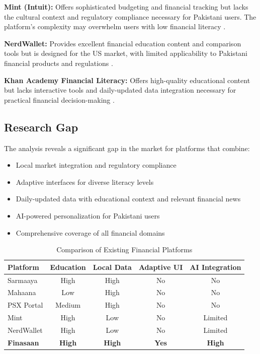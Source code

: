 \documentclass[12pt]{article}
\begin{document}
\textbf{Mint (Intuit):} Offers sophisticated budgeting and financial tracking but lacks the cultural context and regulatory compliance necessary for Pakistani users. The platform's complexity may overwhelm users with low financial literacy \cite{mint2023}.

\textbf{NerdWallet:} Provides excellent financial education content and comparison tools but is designed for the US market, with limited applicability to Pakistani financial products and regulations \cite{nerdwallet2023}.

\textbf{Khan Academy Financial Literacy:} Offers high-quality educational content but lacks interactive tools and daily-updated data integration necessary for practical financial decision-making \cite{khan2023}.

\subsection{Research Gap}

The analysis reveals a significant gap in the market for platforms that combine:
\begin{itemize}
    \item Local market integration and regulatory compliance
    \item Adaptive interfaces for diverse literacy levels
    \item Daily-updated data with educational context and relevant financial news
    \item AI-powered personalization for Pakistani users
    \item Comprehensive coverage of all financial domains
\end{itemize}

\begin{table}[htbp]
\caption{Comparison of Existing Financial Platforms}
\begin{center}
\begin{tabular}{|l|c|c|c|c|}
\hline
\textbf{Platform} & \textbf{Education} & \textbf{Local Data} & \textbf{Adaptive UI} & \textbf{AI Integration} \\ 
\hline
Sarmaaya & High & High & No & No \\ 
\hline
Mahaana & Low & High & No & No \\ 
\hline
PSX Portal & Medium & High & No & No \\ 
\hline
Mint & High & Low & No & Limited \\ 
\hline
NerdWallet & High & Low & No & Limited \\ 
\hline
\textbf{Finasaan} & \textbf{High} & \textbf{High} & \textbf{Yes} & \textbf{High} \\ 
\hline
\end{tabular}
\label{tab:comparison}
\end{center}
\end{table}
\end{document}
